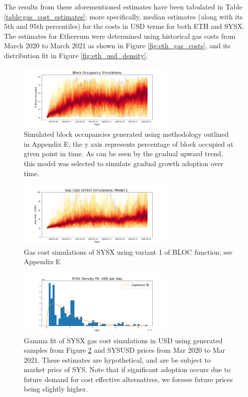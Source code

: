 \documentclass[peerreview]{ieeesyscoin}
\begin{document}
The results from these aforementioned estimates have been tabulated in Table \ref{table:gas_cost_estimates}; more specifically, median estimates (along with its 5th and 95th percentiles) for the costs in USD terms for both ETH and SYSX. The estimates for Ethereum were determined using historical gas costs from March 2020 to March 2021 as shown in Figure \ref{fig:eth_gas_costs}, and its distribution fit in Figure \ref{fig:eth_usd_density}.

\begin{figure}[h!]
\includegraphics[width=3in]{img/blk_occupancy_simulations.png}
\caption{Simulated block occupancies generated using methodology outlined in Appendix E; the y axis represents percentage of block occupied at given point in time. As can be seen by the gradual upward trend, this model was selected to simulate gradual growth adoption over time. } 
\label{fig:blk_occupancy_simulations}
\end{figure} 

\begin{figure}[h!]
\includegraphics[width=3in]{img/sysx_gas_costs_m1.png}
\caption{Gas cost simulations of SYSX using variant 1 of BLOC function; see Appendix E} 
\label{fig:sysx_gas_costs_m1}
\end{figure} 

\begin{figure}[h!]
\includegraphics[width=3in]{img/sysx_usd_density.png}
\caption{Gamma fit of SYSX gas cost simulations in USD using generated samples from Figure \ref{fig:sysx_gas_costs_m1} and SYSUSD prices from Mar 2020 to Mar 2021. These estimates are hypothetical, and are be subject to market price of SYS. Note that if significant adoption occurs due to future demand for cost effective alternatives, we foresee future prices being slightly higher.} 
\label{fig:sysx_usd_density}
\end{figure} 
\end{document}
